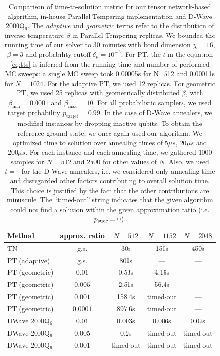 \begin{table}[b]
  \centering
  \begin{tabular}{|l|c|ccc|}
    \hline
    \rowcolor{theader}  Method & approx. ratio & $N=512$   & $N=1152$  & $N=2048$  \\
    \hline
    TN                         & g.s.          & 30s       & 150s      & 450s      \\
    \hline
    \hline
    PT (adaptive)              & g.s.          & 800s      & ---       & ---       \\
    \hline
    PT (geometric)             & $0.01$        & 0.53s     & 4.16s     & ---       \\
    PT (geometric)             & $0.005$       & 2.51s     & 56.4s     & ---       \\
    PT (geometric)             & $0.001$       & 158.4s    & timed-out & ---       \\
    PT (geometric)             & $0.0001$      & 897.6s    & timed-out & ---       \\
    \hline
    \hline
    DWave 2000Q$_6$            & $0.01$        & $0.003$s  & $0.006$s  & $0.02$s   \\
    DWave 2000Q$_6$            & $0.005$       & $0.2$s    & timed-out & timed-out \\
    DWave 2000Q$_6$            & $0.001$       & timed-out & timed-out & timed-out \\
    \hline
    \hline
  \end{tabular}
  \caption{Comparison of time-to-solution metric for our tensor network-based algorithm,
    in-house Parallel Tempering implementation and D-Wave 2000Q$_{6}$. The
    \emph{adaptive} and \emph{geometric} terms refer to the distribution of inverse
    temperature $\beta$ in Parallel Tempering replicas. We bounded the running time
    of our solver to 30 minutes with bond dimension $\chi = 16$, $\beta=3$ and
    probability cutoff $\delta_{p} = 10^{-3}$. For PT, the $t$ in the equation
    \ref{eq:tts} is inferred from the running time and number of performed MC
    sweeps: a single MC sweep took 0.00005s for N=512 and 0.00011s for $N=1024$.
    For the adaptive PT, we used 12 replicas. For geometric PT, we used 25 replicas
    with geometrically distributed $\beta$, with $\beta_{\min}=0.0001$ and
    $\beta_{\max}=10$. For all probabilistic samplers, we used target probability
    $p_{\mbox{target}}=0.99$. In the case of D-Wave annealers, we modified
    instances by dropping inactive qubits. To obtain the reference ground state, we
    once again used our algorithm. We optimized time to solution over annealing
    times of $5\mu s$, $20\mu s$ and $200\mu s$. For each instance and each
    annealing time, we gathered 1000 samples for $N=512$ and 2500 for other values
    of $N$. Also, we used $t=\tau$ for the D-Wave annealers, i.e. we considered
    only annealing time and disregarded other factors contributing to overall
    solution time. This choice is justified by the fact that the other
    contributions are minuscule. The ``timed-out'' string indicates that the given
    algorithm could not find a solution within the given approximation ratio (i.e.
    $p_{\text{succ}}=0$). } \label{tab:tnvspt}
\end{table}

